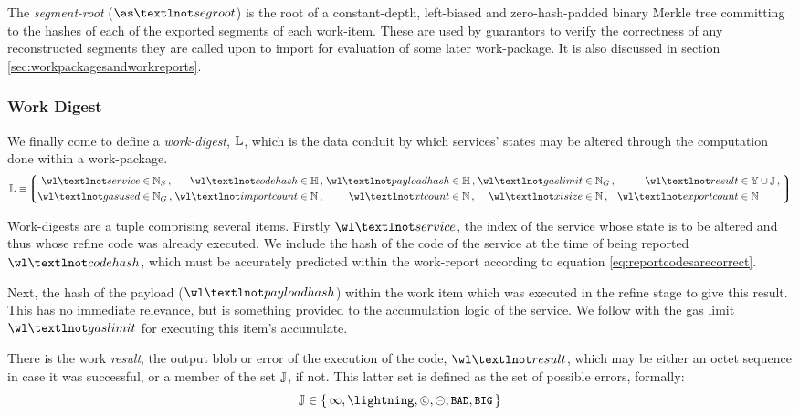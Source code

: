 The \emph{segment-root} ($\as¬segroot$) is the root of a constant-depth, left-biased and zero-hash-padded binary Merkle tree committing to the hashes of each of the exported segments of each work-item. These are used by guarantors to verify the correctness of any reconstructed segments they are called upon to import for evaluation of some later work-package. It is also discussed in section \ref{sec:workpackagesandworkreports}.

\subsubsection{Work Digest}
We finally come to define a \emph{work-digest}, $\mathbb{L}$, which is the data conduit by which services' states may be altered through the computation done within a work-package.
\begin{equation}\label{eq:workdigest}
  \mathbb{L} \equiv \tuple{
    \begin{alignedat}{9}
      \isa{\wl¬service&}{\serviceid}\,,\;
      \isa{&\wl¬codehash&}{\hash}\,,\;
      \isa{&\wl¬payloadhash&}{\hash}\,,\;
      \isa{&\wl¬gaslimit&}{\gas}\,,\;
      \isa{&\wl¬result&}{\blob \cup \workerror}\,,\;\\
      \isa{\wl¬gasused&}{\gas}\,,\;
      \isa{&\wl¬importcount&}{\N}\,,\;
      \isa{&\wl¬xtcount&}{\N}\,,\;
      \isa{&\wl¬xtsize&}{\N}\,,\;
      \isa{&\wl¬exportcount&}{\N}
    \end{alignedat}
  }
\end{equation}

Work-digests are a tuple comprising several items. Firstly $\wl¬service$, the index of the service whose state is to be altered and thus whose refine code was already executed. We include the hash of the code of the service at the time of being reported $\wl¬codehash$, which must be accurately predicted within the work-report according to equation \ref{eq:reportcodesarecorrect}.

Next, the hash of the payload ($\wl¬payloadhash$) within the work item which was executed in the refine stage to give this result. This has no immediate relevance, but is something provided to the accumulation logic of the service. We follow with the gas limit $\wl¬gaslimit$ for executing this item's accumulate.

There is the work \emph{result}, the output blob or error of the execution of the code, $\wl¬result$, which may be either an octet sequence in case it was successful, or a member of the set $\mathbb{J}$, if not. This latter set is defined as the set of possible errors, formally:
\begin{equation}
  \workerror \in \set{ \oog, \panic, \badexports, \oversize, \token{BAD}, \token{BIG} }
\end{equation}

